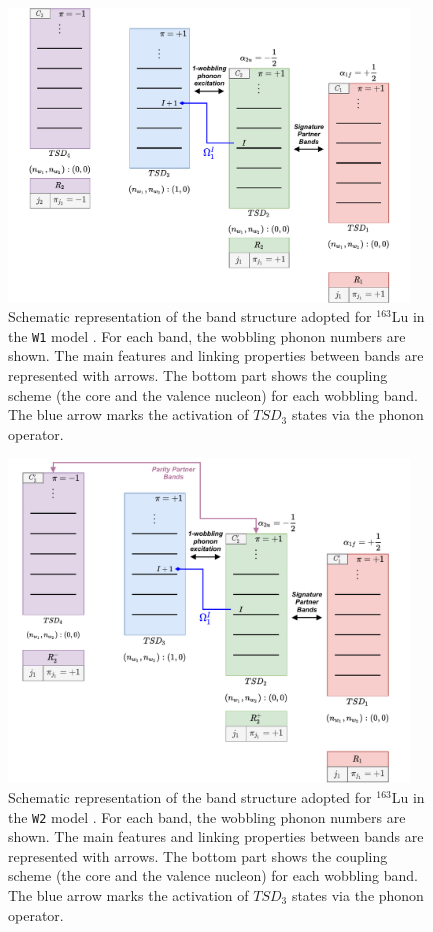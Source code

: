 \documentclass[myclassdoc,debug]{rjparticle}
\begin{document}
\begin{figure}
    \centering
    \includegraphics[width=0.95\textwidth]{figs/W1_Approach.pdf}
    \caption{Schematic representation of the band structure adopted for $^{163}$Lu in the \texttt{W1} model \cite{raduta2020approach,raduta2020towards}. For each band, the wobbling phonon numbers are shown. The main features and linking properties between bands are represented with arrows. The bottom part shows the coupling scheme (the core and the valence nucleon) for each wobbling band. The blue arrow marks the activation of $TSD_3$ states via the phonon operator.}
    \label{w1-model-worfklow}
\end{figure}
\begin{figure}
  \centering
    \includegraphics[width=0.95\textwidth]{figs/W2_Approach.pdf}
    \caption{Schematic representation of the band structure adopted for $^{163}$Lu in the \texttt{W2} model \cite{poenaru2021parity}. For each band, the wobbling phonon numbers are shown. The main features and linking properties between bands are represented with arrows. The bottom part shows the coupling scheme (the core and the valence nucleon) for each wobbling band. The blue arrow marks the activation of $TSD_3$ states via the phonon operator.}
    \label{w2-model-worfklow}
\end{figure}
\end{document}
